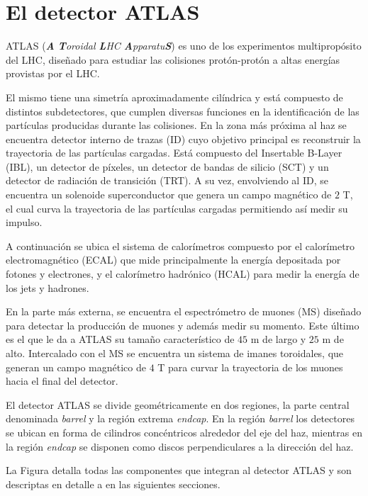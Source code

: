 \section{El detector ATLAS}

ATLAS (\textit{\textbf{A} \textbf{T}oroidal \textbf{L}HC \textbf{A}pparatu\textbf{S}})  \cite{PERF-2007-01} es uno de los experimentos multipropósito del LHC, diseñado para estudiar las colisiones protón-protón a altas energías provistas por el LHC.

El mismo tiene una simetría aproximadamente cilíndrica y está compuesto de distintos subdetectores, que cumplen diversas funciones en la identificación de las partículas producidas durante las colisiones. En la zona más próxima al haz se encuentra detector interno de trazas (ID) cuyo objetivo principal es reconstruir la trayectoria de las partículas cargadas. Está compuesto del Insertable B-Layer (IBL), un detector de píxeles, un detector de bandas de silicio (SCT) y un detector de radiación de transición (TRT). A su vez, envolviendo al ID, se encuentra un solenoide superconductor que genera un campo magnético de $2$ T, el cual curva la trayectoria de las partículas cargadas permitiendo así medir su impulso.

A continuación se ubica el sistema de calorímetros compuesto por el calorímetro electromagnético (ECAL) que mide principalmente la energía depositada por fotones y electrones, y el calorímetro hadrónico (HCAL) para medir la energía de los jets y hadrones.

En la parte más externa, se encuentra el espectrómetro de muones (MS) diseñado para detectar la producción de muones y además medir su momento. Este último es el que le da a ATLAS su tamaño característico de $45$ m de largo y $25$ m de alto. Intercalado con el MS se encuentra un sistema de imanes toroidales, que generan un campo magnético de $4$ T para curvar la trayectoria de los muones hacia el final del detector.

El detector ATLAS se divide geométricamente en dos regiones, la parte central denominada \textit{barrel} y la región extrema \textit{endcap}. En la región \textit{barrel} los detectores se ubican en forma de cilindros concéntricos alrededor del eje del haz, mientras en la región \textit{endcap} se disponen como discos perpendiculares a la dirección del haz. 

La Figura  detalla todas las componentes que integran al detector ATLAS y son descriptas en detalle a en las siguientes secciones.

